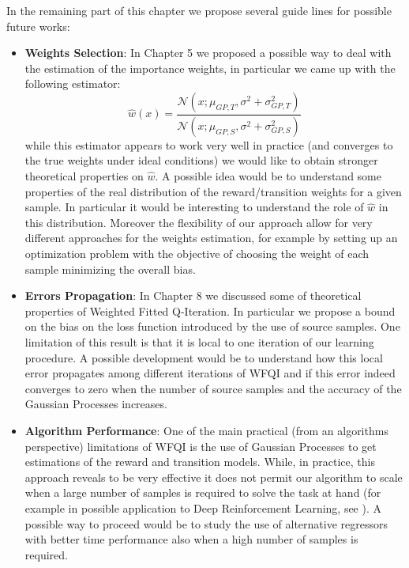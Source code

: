   \noindent In the remaining part of this chapter we propose several guide lines for possible future works:
  \begin{itemize}
    \item \textbf{Weights Selection}: In Chapter 5 we proposed a possible way to deal with the estimation
      of the importance weights, in particular we came up with the following estimator:
      \begin{equation*}
        \hat{w}(x) = \frac{\mathcal{N}(x; \mu_{GP,T}, \sigma^{2} + \sigma^{2}_{GP,T})}{\mathcal{N}(x; \mu_{GP,S}, \sigma^{2} + \sigma^{2}_{GP,S})}
      \end{equation*}
      while this estimator appears to work very well in practice (and converges to the true weights under ideal conditions)
      we would like to obtain stronger theoretical properties on $\hat{w}$. A possible idea would be to understand some
      properties of the real distribution of the reward/transition weights for a given sample. In particular
      it would be interesting to understand the role of $\hat{w}$ in this distribution.\newline
      Moreover the flexibility of our approach allow for very different approaches for the weights estimation, for
      example by setting up an optimization problem with the objective of choosing the weight of each sample
      minimizing the overall bias.
    \item \textbf{Errors Propagation}: In Chapter 8 we discussed some of theoretical properties of Weighted Fitted Q-Iteration.
      In particular we propose a bound on the bias on the loss function introduced by the use of source samples. One
      limitation of this result is that it is local to one iteration of our learning procedure. A possible
      development would be to understand how this local error propagates among different iterations of WFQI and
      if this error indeed converges to zero when the number of source samples and the accuracy of the Gaussian
      Processes increases.
    \item \textbf{Algorithm Performance}: One of the main practical (from an algorithms perspective) limitations of WFQI is the use
      of Gaussian Processes to get estimations of the reward and transition models. While, in practice, this approach
      reveals to be very effective it does not permit our algorithm to scale when a large number of samples is required
      to solve the task at hand (for example in possible application to Deep Reinforcement Learning, see \cite{mnih2015human}).
      A possible way to proceed would be to study the use of alternative regressors with better time performance also
      when a high number of samples is required.
  \end{itemize}
